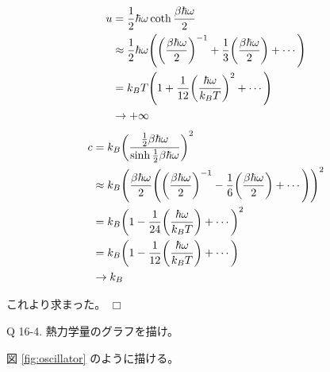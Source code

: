 \documentclass[uplatex,dvipdfmx,a4paper,11pt]{jlreq}
\theoremstyle{definition}
\begin{document}
\begin{align}
  u        & = \frac{1}{2}\hbar\omega\coth\frac{\beta\hbar\omega}{2}                                                                          \\
           & \approx \frac{1}{2}\hbar\omega\qty(\qty(\frac{\beta\hbar\omega}{2})^{-1} + \frac{1}{3}\qty(\frac{\beta\hbar\omega}{2}) + \cdots) \\
           & = k_BT\qty(1 + \frac{1}{12}\qty(\frac{\hbar\omega}{k_BT})^{2} + \cdots)                                                          \\
           & \to +\infty                                                                                                                      \\
\end{align}
\begin{align}
  c & = k_B\qty(\frac{\frac{1}{2}\beta\hbar\omega}{\sinh\frac{1}{2}\beta\hbar\omega})^2                                                               \\
    & \approx k_B\qty(\frac{\beta\hbar\omega}{2}\qty(\qty(\frac{\beta\hbar\omega}{2})^{-1} - \frac{1}{6}\qty(\frac{\beta\hbar\omega}{2}) + \cdots))^2 \\
    & = k_B\qty(1 - \frac{1}{24}\qty(\frac{\hbar\omega}{k_BT}) + \cdots)^2                                                                            \\
    & = k_B\qty(1 - \frac{1}{12}\qty(\frac{\hbar\omega}{k_BT}) + \cdots)                                                                              \\
    & \to k_B
\end{align}

これより求まった。 $\Box$

\begin{itembox}[l]{Q 16-4.}
  熱力学量のグラフを描け。
\end{itembox}

図 \ref{fig:oscillator} のように描ける。
\end{document}
